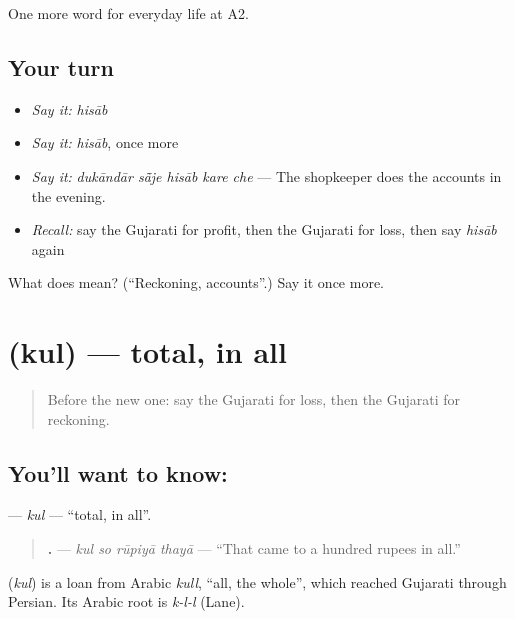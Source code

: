 \begin{grammarlens}[title={What you've built}]
One more word for everyday life at A2.
\end{grammarlens}

\subsection*{Your turn}
\begin{itemize}
\raggedright
  \item \emph{Say it:} \emph{hisāb}
  \item \emph{Say it:} \emph{hisāb}, once more
  \item \emph{Say it:} \emph{dukāndār sā̃je hisāb kare che} — The shopkeeper does the accounts in the evening.
  \item \emph{Recall:} say the Gujarati for profit, then the Gujarati for loss, then say \emph{hisāb} again
\end{itemize}

\begin{tcolorbox}[breakable,colback=teal!4,colframe=teal!35!black,title={Before you move on}]
What does  mean? (\textquotedblleft{}Reckoning, accounts\textquotedblright{}.) Say it once more.
\end{tcolorbox}
\section[\texorpdfstring{\gu{કુલ} (kul)}{કુલ (kul)}]{ (kul) — total, in all}

\label{lesson:GU-C192-kul}



\begin{quote}
Before the new one: say the Gujarati for loss, then the Gujarati for reckoning.
\end{quote}

\subsection*{You'll want to know: }
\textbf{} — \emph{kul} — \textquotedblleft{}total, in all\textquotedblright{}.

\begin{quote}
\textbf{   .} — \emph{kul so rūpiyā thayā} — \textquotedblleft{}That came to a hundred rupees in all.\textquotedblright{}
\end{quote}

\begin{cousinweb}
\textbf{} (\emph{kul}) is a loan from Arabic \emph{kull}, \textquotedblleft{}all, the whole\textquotedblright{}, which reached Gujarati through Persian. Its Arabic root is \emph{k-l-l} (Lane).
\end{cousinweb}

